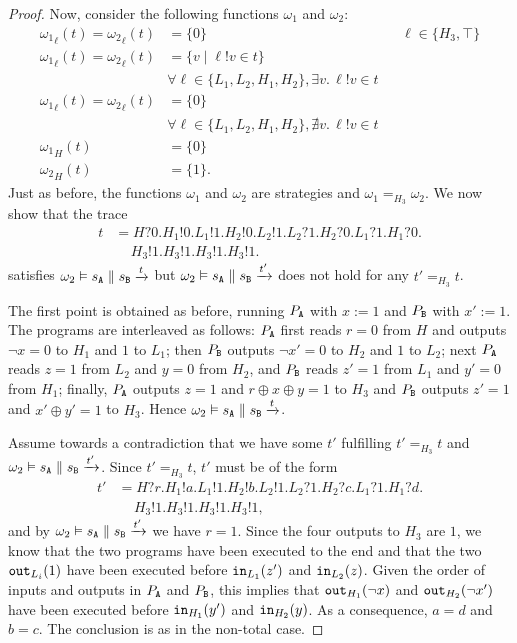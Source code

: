 \documentclass[preprint,5p,twocolumn]{elsarticle}
\begin{document}
\begin{proof}
  Now, consider the following functions $\omega_1$ and $\omega_2$:
  \begin{align*}
    {\omega_1}_{\ell}(t) = {\omega_2}_{\ell}(t) &= \{0\} && \ell \in \{H_3, \top\}\\
    {\omega_1}_{\ell}(t) = {\omega_2}_{\ell}(t) &= \lbrace v \mid \ell ! v \in t \rbrace \\
                                              & \forall \ell \in \{L_1,L_2,H_1,H_2\}, \exists v.\,\ell!v \in t\\
    {\omega_1}_{\ell}(t) = {\omega_2}_{\ell}(t) &= \{0\} \\
                                              & \forall \ell \in \{L_1,L_2,H_1,H_2\}, \nexists v.\,\ell!v \in t\\
    {\omega_1}_H(t) &= \{0\} \\
    {\omega_2}_H(t) &= \{1\}.
  \end{align*}
  Just as before, the functions $\omega_1$ and $\omega_2$ are strategies and $\omega_1 =_{H_3} \omega_2$. We now show that the trace
  \begin{align*}
    t &= H?0.H_1!0.L_1!1.H_2!0.L_2!1.L_2?1.H_2?0.L_1?1.H_1?0.\\
      &\quad\,H_3!1.H_3!1.H_3!1.H_3!1.
  \end{align*}
  satisfies $\omega_2 \vDash s_{\mathtt{A}} \parallel s_{\mathtt{B}} \xrightarrow{t}$ but 
  $\omega_2 \vDash s_{\mathtt{A}} \parallel s_{\mathtt{B}} \xrightarrow{t'}$ does not hold for any $t' =_{H_3} t$.

  The first point is obtained as before, running $P_{\mathtt{A}}$ with $x := 1$ and $P_{\mathtt{B}}$ with $x' := 1$.
  The programs are interleaved as follows: $P_{\mathtt{A}}$ first reads $r=0$ from $H$ and outputs $\neg x=0$
  to $H_1$ and $1$ to $L_1$; then $P_{\mathtt{B}}$ outputs $\neg x'=0$ to $H_2$ and $1$ to $L_2$; next
  $P_{\mathtt{A}}$ reads $z=1$ from $L_2$ and $y=0$ from $H_2$,
  and $P_{\mathtt{B}}$ reads $z'=1$ from $L_1$ and $y'=0$ from $H_1$;
  finally, $P_{\mathtt{A}}$ outputs $z=1$ and $r \oplus x \oplus y=1$ to $H_3$ and $P_{\mathtt{B}}$ outputs $z'=1$
  and $x' \oplus y'=1$ to $H_3$. Hence $\omega_2 \vDash s_{\mathtt{A}} \parallel s_{\mathtt{B}} \xrightarrow{t}$.

  Assume towards a contradiction that we have some $t'$ fulfilling $t' =_{H_3} t$
  and $\omega_2 \vDash s_{\mathtt{A}} \parallel s_{\mathtt{B}} \xrightarrow{t'}$. Since $t' =_{H_3} t$, $t'$ must
  be of the form
  \begin{align*}
    t' &= H?r.H_1!a.L_1!1.H_2!b.L_2!1.L_2?1.H_2?c.L_1?1.H_1?d.\\
      &\quad\,H_3!1.H_3!1.H_3!1.H_3!1,
  \end{align*}
  and by $\omega_2 \vDash s_{\mathtt{A}} \parallel s_{\mathtt{B}} \xrightarrow{t'}$ we have $r=1$.
  Since the four outputs to $H_3$ are $1$, we know that the two programs have been executed
  to the end and that the two $\mathtt{out}_{L_i}(1)$ have been executed before 
  $\mathtt{in}_{L_1}(z')$ and $\mathtt{in}_{L_2}(z)$. Given the order of inputs and outputs in $P_{\mathtt{A}}$ and $P_{\mathtt{B}}$,
  this implies that $\mathtt{out}_{H_1}(\neg x)$ and $\mathtt{out}_{H_2}(\neg x')$ have been executed
  before $\mathtt{in}_{H_1}(y')$ and $\mathtt{in}_{H_2}(y)$. As a consequence, $a=d$ and $b=c$. The conclusion
  is as in the non-total case.  
\end{proof}
\end{document}
